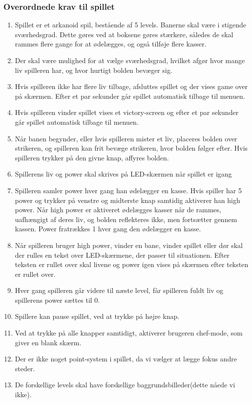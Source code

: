 \subsubsection{Overordnede krav til spillet}
\begin{enumerate}
\item Spillet er et arkanoid spil, bestående af 5 levels. Banerne skal være i stigende sværhedsgrad. Dette gøres ved at boksene gøres stærkere, således de skal rammes flere gange for at ødelægges, og også tilføje flere kasser.
\item Der skal være mulighed for at vælge sværhedsgrad, hvilket afgør hvor mange liv spilleren har, og hvor hurtigt bolden bevæger sig.
\item Hvis spilleren ikke har flere liv tilbage, afsluttes spillet og der vises game over på skærmen. Efter et par sekunder går spillet automatisk tilbage  til menuen.
\item Hvis spilleren vinder spillet vises et victory-screen og efter et par sekunder går spillet automatisk tilbage til menuen.
\item Når banen begynder, eller hvis spilleren mister et liv, placeres bolden over strikeren, og spilleren kan frit bevæge strikeren, hvor bolden følger efter. Hvis spilleren trykker på den givne knap, affyres bolden.
\item Spillerens liv og power skal skrives på LED-skærmen når spillet er igang
\item Spilleren samler power hver gang han ødelægger en kasse. Hvis spiller har 5 power og trykker på venstre og midterste knap samtidig aktiverer han high power. Når high power er aktiveret ødelægges kasser når de rammes, uafhængigt af deres liv, og bolden reflekteres ikke, men fortsætter gennem kassen. Power fratrækkes 1 hver gang den ødelægger en kasse.
\item Når spilleren bruger high power, vinder en bane, vinder spillet eller dør skal der rulles en tekst over LED-skærmene, der passer til situationen. Efter teksten er rullet over skal livene og power igen vises på skærmen efter teksten er rullet over.
\item Hver gang spilleren går videre til næste level, får spilleren fuldt liv og spillerens power sættes til 0.
\item Spillere kan pause spillet, ved at trykke på højre knap.
\item Ved at trykke på alle knapper samtidigt, aktiverer brugeren chef-mode, som giver en blank skærm.  
\item Der er ikke noget point-system i spillet, da vi vælger at lægge fokus andre steder.
\item De forskellige levels skal have forskellige baggrundsbilleder(dette nåede vi ikke).
\end{enumerate}
